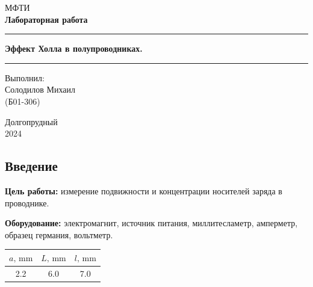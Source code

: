 \documentclass[a4paper, 12pt]{article}
\begin{document}

\begin{titlepage}
    \begin{center}
        \vspace*{5cm}
        \Huge МФТИ
        \vspace*{2cm}\\
        \LARGE \textbf{Лабораторная работа}
        \\\vspace*{0.25cm}

        \noindent\rule{\textwidth}{1pt}
        \vspace*{-0.25cm}

        \huge \textbf{Эффект Холла в полупроводниках.}
        \noindent\rule{\textwidth}{1pt}

        \vfill

        \begin{flushright}
            \begin{minipage}{.4\textwidth}
            \Large Выполнил: \\ Солодилов Михаил \\ (Б01-306)
            \end{minipage}
        \end{flushright}

        \vfill

        \normalsize Долгопрудный \\2024
    \end{center}
\end{titlepage}

\restoregeometry

\begin{center}
    \section*{Введение}
\end{center}

\noindent \textbf{Цель работы:}
измерение подвижности и концентрации носителей заряда в проводнике.

\bigskip

\noindent \textbf{Оборудование:}
электромагнит, источник питания, миллитесламетр, амперметр,
образец германия, вольтметр.

\centering
\begin{tabular}{|c|c|c|}
    \toprule
    \( a, \, \text{mm} \) & \( L, \, \text{mm} \) & \( l, \, \text{mm} \) \\
    \midrule
    2.2 & 6.0 & 7.0 \\
    \bottomrule
\end{tabular}
\end{document}
